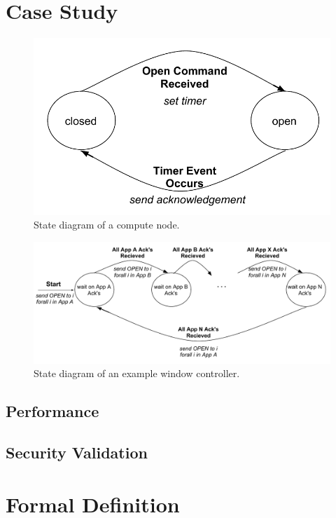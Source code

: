 \documentclass{article}
\begin{document}
\section{Case Study}
\begin{figure}
\centering
\includegraphics[scale=0.5]{node_state_diagram.pdf}
\caption{State diagram of a compute node.}
\label{fig:node_state_diagram}
\end{figure}
\begin{figure}
\centering
\includegraphics[scale=0.5]{control_state_diagram.pdf}
\caption{State diagram of an example window controller.}
\label{fig:control_state_diagram}
\end{figure}

\subsection{Performance}
\subsection{Security Validation}
\section{Formal Definition}
\end{document}
